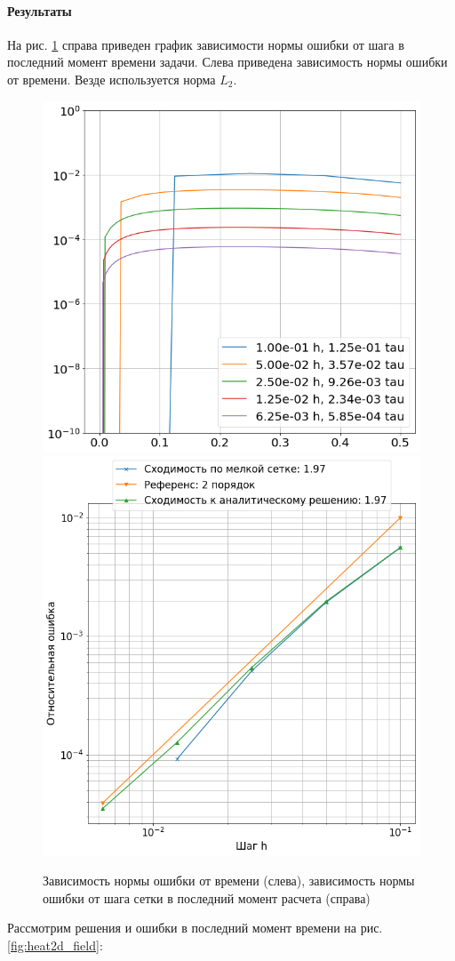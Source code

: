\paragraph{Результаты}
На рис. \ref{fig:heat2d_time_error} справа приведен график зависимости нормы ошибки от шага в последний момент времени задачи. Слева приведена зависимость нормы ошибки от времени. Везде используется норма $L_2$.
\begin{figure}[H]
\centering
\includegraphics[width=.5\textwidth]{heat2d/time_error.png}\hfill
\includegraphics[width=.5\textwidth]{heat2d/convergence2d.png}
\caption{Зависимость нормы ошибки от времени (слева), зависимость нормы ошибки от шага сетки в последний момент расчета (справа)}
\label{fig:heat2d_time_error}
\end{figure}

Рассмотрим решения и ошибки в последний момент времени на рис. \ref{fig:heat2d_field}:


